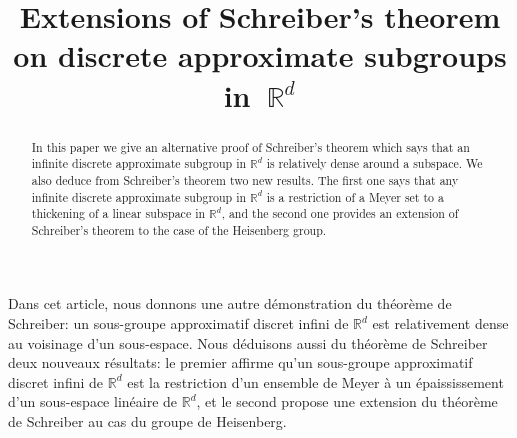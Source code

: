 \documentclass[JEP,XML,SOM,Unicode,NoEqCountersInSection]{cedram}
\theoremstyle{plain}
\theoremstyle{definition}
\begin{document}
\frontmatter
\title{Extensions of Schreiber's theorem on discrete approximate subgroups in~$\mathbb{R}^d$}

\author[\initial{A.} \lastname{Fish}]{ }
\address{School of Mathematics and Statistics F07, University of Sydney\\
NSW 2006, Australia}

\begin{abstract}
In this paper we give an alternative proof of Schreiber's theorem which says that an infinite discrete approximate subgroup in $\mathbb{R}^d$ is relatively dense around a subspace. We also deduce from Schreiber's theorem two new results. The first one says that any infinite discrete approximate subgroup in $\mathbb{R}^d$ is a restriction of a Meyer set to a thickening of a linear subspace in $\mathbb{R}^d$, and the second one provides an extension of Schreiber's theorem to the case of the Heisenberg group.
\end{abstract}





\begin{altabstract}
Dans cet article, nous donnons une autre démonstration du théorème de Schreiber: un sous-groupe approximatif discret infini de $\mathbb{R}^d$ est relativement dense au voisinage d'un sous-espace. Nous déduisons aussi du théorème de Schreiber deux nouveaux résultats: le premier affirme qu'un sous-groupe approximatif discret infini de $\mathbb{R}^d$ est la restriction d'un ensemble de Meyer à un épaississement d'un sous-espace linéaire de $\mathbb{R}^d$, et le second propose une extension du théorème de Schreiber au cas du groupe de Heisenberg.
\end{altabstract}

\maketitle
\vspace*{-\baselineskip}%
\tableofcontents
\mainmatter
\end{document}
